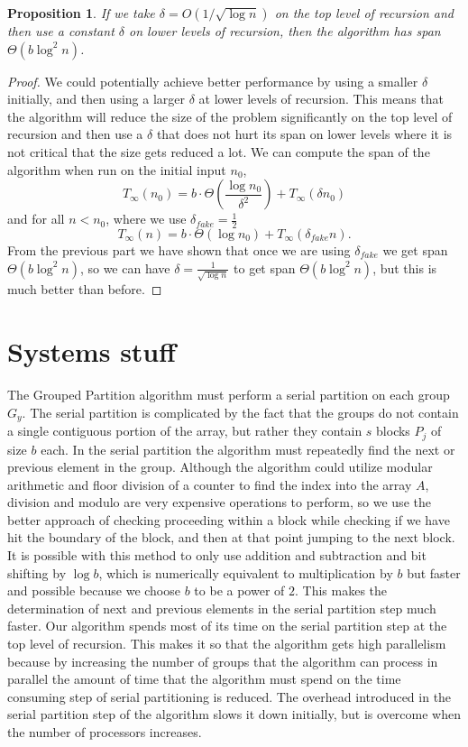 \documentclass[twocolumn, twoside, 12pt]{article}
\renewcommand{\paragraph}[1]{\vspace{0.09in}\noindent{\bf \boldmath #1.}}
\newtheorem{proposition}{Proposition}
\begin{document}
\begin{proposition}
	If we take $\delta = O(1 / \sqrt{\log n})$ on the top level of recursion and then use a constant $\delta$ on lower levels of recursion, then the algorithm has span $\Theta(b\log^2 n)$.
\end{proposition}
\begin{proof}
We could potentially achieve better performance by using a smaller $\delta$ initially, and then using a larger $\delta$ at lower levels of recursion.
This means that the algorithm will reduce the size of the problem significantly on the top level of recursion and then use a $\delta$ that does not hurt its span on lower levels where it is not critical that the size gets reduced a lot.
We can compute the span of the algorithm when run on the initial input $n_0$,
$$T_\infty(n_0) = b\cdot \Theta(\frac{\log n_0}{\delta ^2})+T_\infty(\delta n_0)$$
and for all $n<n_0$, where we use $\delta_{fake} = \frac{1}{2}$
$$T_\infty(n) =  b\cdot \Theta(\log n_0)+T_\infty(\delta_{fake} n).$$
From the previous part we have shown that once we are using $\delta_{fake}$ we get span $\Theta(b\log^2 n)$, so we can have $\delta = \frac{1}{\sqrt{\log n}}$ to get span $\Theta(b\log^2 n)$, but this is much better than before. 
\end{proof}
	
	
\section{Systems stuff}

\paragraph{Optimizations}
The Grouped Partition algorithm must perform a serial partition on each group $G_y$.
The serial partition is complicated by the fact that the groups do not contain a single contiguous portion of the array, but rather they contain $s$ blocks $P_j$ of size $b$ each.
In the serial partition the algorithm must repeatedly find the next or previous element in the group.
Although the algorithm could utilize modular arithmetic and floor division of a counter to find the index into the array $A$, division and modulo are very expensive operations to perform, so we use the better approach of checking proceeding within a block while checking if we have hit the boundary of the block, and then at that point jumping to the next block.
It is possible with this method to only use addition and subtraction and bit shifting by $\log b$, which is numerically equivalent to multiplication by $b$ but faster and possible because we choose $b$ to be a power of $2$.
This makes the determination of next and previous elements in the serial partition step much faster.
Our algorithm spends most of its time on the serial partition step at the top level of recursion.
This makes it so that the algorithm gets high parallelism because by increasing the number of groups that the algorithm can process in parallel the amount of time that the algorithm must spend on the time consuming step of serial partitioning is reduced.
The overhead introduced in the serial partition step of the algorithm slows it down initially, but is overcome when the number of processors increases.
\end{document}
